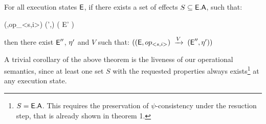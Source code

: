 %
%

\begin{theorem}
\label{theorem:three}
For all execution states ${\normalfont \textsf{E}}$, if there exists a set of effects
$S\subseteq {\normalfont \textsf{E}}.{\normalfont \textsf{A}}$, such that: 
\begin{fmathpar}
 {(\E,op_{<s,i>})} {} {(\E',\eff)} \spc \wedge \spc ( \psi {} E' )  
\end{fmathpar}
then there exist  ${\normalfont \textsf{E}}''$, $\eta'$ and $V$ such that:
$(({\normalfont \textsf{E}},op_{<s,i>})\;\xrightarrow{V}\;({\normalfont \textsf{E}}'',\eta'))$
\end{theorem}
A trivial corollary of the above theorem is the liveness of our operational
semantics, since at least one set $S$ with the requested
properties always exists\footnote{$S={\normalfont \textsf{E}}.{\normalfont \textsf{A}}$. This requires the
preservation of $\psi$-consistency under the resuction step, that is
already shown in theorem 1.} at any execution state. 



